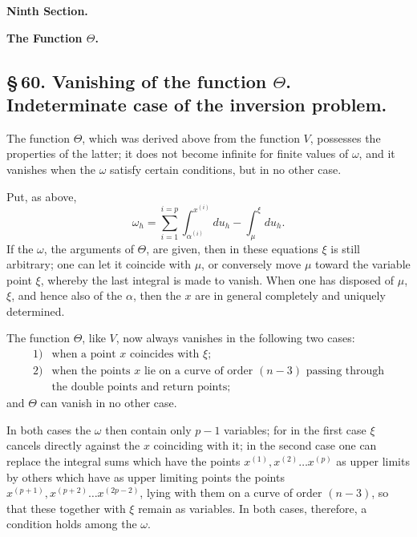 \documentclass[10pt]{article}
\begin{document}
\begin{center}
{\bfseries Ninth Section.}\par\vspace{0.6em}
{\Large\bfseries The Function \(\Theta\).}
\end{center}

\subsection*{\S\,60. Vanishing of the function \(\Theta\). Indeterminate case of the inversion problem.}

The function \(\Theta\), which was derived above from the function \(V\), possesses the properties of the latter; it does not become infinite for finite values of \(\omega\), and it vanishes when the \(\omega\) satisfy certain conditions, but in no other case.

Put, as above,
\[
\tag{1}
\omega_h=\sum_{i=1}^{i=p}\int_{\alpha^{(i)}}^{x^{(i)}}du_h-\int_{\mu}^{\xi}du_h .
\]
If the \(\omega\), the arguments of \(\Theta\), are given, then in these equations \(\xi\) is still arbitrary; one can let it coincide with \(\mu\), or conversely move \(\mu\) toward the variable point \(\xi\), whereby the last integral is made to vanish. When one has disposed of \(\mu\), \(\xi\), and hence also of the \(\alpha\), then the \(x\) are in general completely and uniquely determined.

The function \(\Theta\), like \(V\), now always vanishes in the following two cases:
\[
\begin{array}{ll}
1) & \text{when a point }x\text{ coincides with }\xi;\\
2) & \text{when the points }x\text{ lie on a curve of order }(n-3)\text{ passing through}\\
   & \text{the double points and return points;}
\end{array}
\]
and \(\Theta\) can vanish in no other case.

In both cases the \(\omega\) then contain only \(p-1\) variables; for in the first case \(\xi\) cancels directly against the \(x\) coinciding with it; in the second case one can replace the integral sums which have the points \(x^{(1)},x^{(2)}\ldots x^{(p)}\) as upper limits by others which have as upper limiting points the points \(x^{(p+1)},x^{(p+2)}\ldots x^{(2p-2)}\), lying with them on a curve of order \((n-3)\), so that these together with \(\xi\) remain as variables. In both cases, therefore, a condition holds among the \(\omega\).
\end{document}
